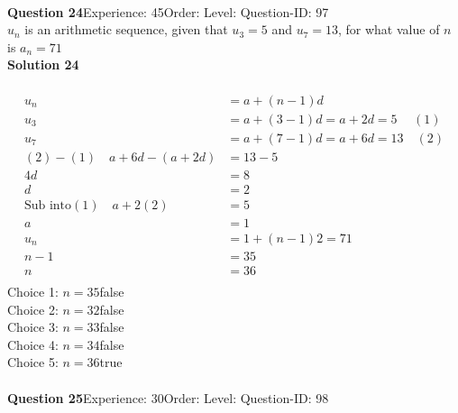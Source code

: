 \documentclass{article}
\begin{document}
\\[4pt]
\noindent\textbf{Question 24}\hspace{20pt}Experience: 45\hspace{20pt}Order: \hspace{20pt}Level: \hspace{20pt}Question-ID: 97\\[2pt]
$u_n$ is an arithmetic sequence, given that $u_{3}=5$ and $u_{7}=13$, for what value of $n$ is $a_n=71$\\[4pt]
\noindent\textbf{Solution 24}\\[2pt]
\\[-35pt]\begin{align*}
u_n&=a+(n-1)d\\[2pt]
u_3&=a+(3-1)d=a+2d=5 \hspace{15pt} (1)\\[2pt]
u_7&=a+(7-1)d=a+6d=13\quad (2) \\[2pt]
(2)-(1)\quad a+6d-(a+2d)&=13-5\\[2pt]
4d&=8\\[2pt]
d&=2\\[12pt]
\text{Sub into} (1) \quad a+2(2)&=5\\[2pt]
a&=1\\[12pt]
u_n&=1+(n-1)2=71\\[2pt]
n-1&=35\\[2pt]
n&=36\\[-60pt]
\end{align*}
Choice 1: \hspace{20pt}$n=35$\hspace{20pt}false\\
Choice 2: \hspace{20pt}$n=32$\hspace{20pt}false\\
Choice 3: \hspace{20pt}$n=33$\hspace{20pt}false\\
Choice 4: \hspace{20pt}$n=34$\hspace{20pt}false\\
Choice 5: \hspace{20pt}$n=36$\hspace{20pt}true\\
\\[4pt]
\noindent\textbf{Question 25}\hspace{20pt}Experience: 30\hspace{20pt}Order: \hspace{20pt}Level: \hspace{20pt}Question-ID: 98\\[2pt]
\end{document}
